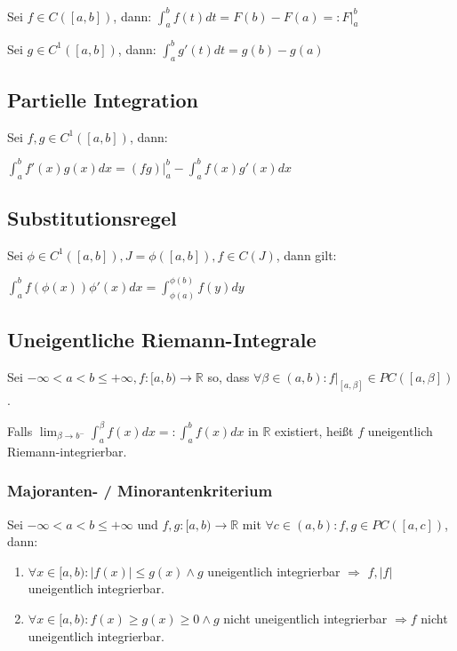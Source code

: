 Sei $f \in C([a, b])$, dann: $\int_a^b f(t) dt = F(b) - F(a) =: F|_a^b$

Sei $g \in C^1([a, b])$, dann: $\int_a^b g'(t) dt = g(b) - g(a)$

\subsection*{Partielle Integration}

Sei $f, g \in C^1([a, b])$, dann:

$\int_a^b f'(x)g(x) dx = (fg)|_a^b - \int_a^b f(x)g'(x) dx$

\subsection*{Substitutionsregel}

Sei $\phi \in C^1([a, b]), J = \phi([a,b]), f \in C(J)$, dann gilt:

$\int_a^b f(\phi(x))\phi'(x) dx = \int_{\phi(a)}^{\phi(b)} f(y) dy$

\subsection*{Uneigentliche Riemann-Integrale}

Sei $-\infty < a < b \leq +\infty, f : [a, b) \rightarrow \mathbb{R}$ so, dass $\forall \beta \in (a, b): f|_{[a, \beta]} \in PC([a, \beta])$.

Falls $\lim_{\beta \to b^-} \int_a^\beta f(x) dx =: \int_a^b f(x) dx$ in $\mathbb{R}$ existiert, heißt $f$ uneigentlich Riemann-integrierbar.

\subsubsection*{Majoranten- / Minorantenkriterium}

Sei $-\infty < a < b \leq +\infty$ und $f, g : [a, b) \to \mathbb{R}$ mit $\forall c \in (a, b) : f, g \in PC([a, c])$, dann:

\begin{enumerate}[label=(\alph*)]
	\item $\forall x \in [a, b) : |f(x)| \leq g(x) \land g$ uneigentlich integrierbar $\Rightarrow$ $f, |f|$ uneigentlich integrierbar.
	\item $\forall x \in [a, b): f(x) \geq g(x) \geq 0 \land g$ nicht uneigentlich integrierbar $\Rightarrow f$ nicht uneigentlich integrierbar.
\end{enumerate}

